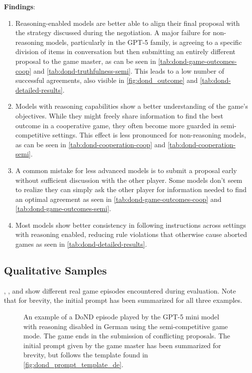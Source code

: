 \documentclass[../main.tex]{subfiles}
\begin{document}
\textbf{Findings}:
\begin{enumerate}
    \item Reasoning-enabled models are better able to align their final proposal with the strategy discussed during the negotiation. A major failure for non-reasoning models, particularly in the GPT-5 family, is agreeing to a specific division of items in conversation but then submitting an entirely different proposal to the game master, as can be seen in \cref{tab:dond-game-outcomes-coop} and \cref{tab:dond-truthfulness-semi}. This leads to a low number of successful agreements, also visible in \cref{fig:dond_outcome} and \cref{tab:dond-detailed-results}.
    \item Models with reasoning capabilities show a better understanding of the game's objectives. While they might freely share information to find the best outcome in a cooperative game, they often become more guarded in semi-competitive settings. This effect is less pronounced for non-reasoning models, as can be seen in \cref{tab:dond-cooperation-coop} and \cref{tab:dond-cooperation-semi}.
    \item A common mistake for less advanced models is to submit a proposal early without sufficient discussion with the other player. Some models don't seem to realize they can simply ask the other player for information needed to find an optimal agreement as seen in \cref{tab:dond-game-outcomes-coop} and \cref{tab:dond-game-outcomes-semi}.
    \item Most models show better consistency in following instructions across settings with reasoning enabled, reducing rule violations that otherwise cause aborted games as seen in \cref{tab:dond-detailed-results}.
\end{enumerate}

\subsection{Qualitative Samples} 

, , and  show different real game episodes encountered during evaluation. Note that for brevity, the initial prompt has been summarized for all three examples.

\begin{figure}[ht!]
  \centering
  
  \caption{An example of a DoND episode played by the GPT-5 mini model with reasoning disabled in German using the semi-competitive game mode. The game ends in the submission of conflicting proposals. The initial prompt given by the game master has been summarized for brevity, but follows the template found in \cref{fig:dond_prompt_template_de}.}
  \label{fig:dond_example_de}
\end{figure}
\end{document}
